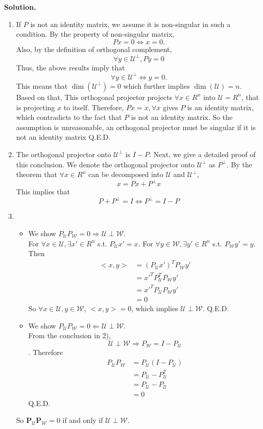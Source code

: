 \documentclass[english,onecolumn]{IEEEtran}
\newcommand{\Pb}{\mathbf{P}}
\newcommand{\Ucal}{\mathcal{U}}
\newcommand{\Wcal}{\mathcal{W}}
\begin{document}
\noindent
\textbf{Solution.}
\begin{enumerate}
	\item If $P$ is not an identity matrix, we assume it is non-singular in such a condition. By the property of non-singular matrix,
	$$Px = 0 \Leftrightarrow x =0.$$
	Also, by the definition of orthogonal complement,
	$$\forall y\in \mathcal{U}^{\perp}, Py=0$$
	Thus, the above results imply that
	$$\forall y\in \mathcal{U}^{\perp}\Leftrightarrow y=0.$$
	This means that $\dim({\mathcal{U}^{\perp}})=0$ which further implies $\dim(\mathcal{U})=n$. Based on that, This orthogonal projector projects $\forall x\in R^n$ into $\mathcal{U}=R^n$, that is projecting $x$ to itself. Therefore, $Px=x,\forall x$ gives $P$ is an identity matrix, which contradicts to the fact that $P$ is not an identity matrix. So the assumption is unreasonable, an orthogonal projector must be singular if it is not an identity matrix Q.E.D.
	\item The orthogonal projector onto $\mathcal{U}^{\perp}$ is $I-P$. Next, we give a detailed proof of this conclusion. We denote the orthogonal projector onto $\mathcal{U}^{\perp}$ as $P^{\perp}$. By the theorem that $\forall x \in R^n$ can be decomposed into $\mathcal{U} $ and $\mathcal{U}^{\perp}$, 
		$$x = Px+P^{\perp}x$$
		This implies that $$P+P^{\perp} = I \Leftrightarrow P^{\perp} = I-P$$
	\item \begin{itemize}
		\item We show $P_\mathcal{U}P_{\mathcal{W}}=0\Rightarrow \mathcal{U}\perp \mathcal{W}$.\\ For $\forall x \in \mathcal{U},\exists x' \in R^n$ s.t. $P_\mathcal{U}x'=x$. For $\forall y \in \mathcal{W},\exists y' \in R^n$ s.t. $P_\mathcal{W}y'=y$. Then 
			\begin{align*}
				<x,y> &= (P_{\mathcal{U}}x')^TP_{\mathcal{W}}y'\\
				&=x'^TP_{\mathcal{U}}^TP_{\mathcal{W}}y'\\
				&=x'^TP_{\mathcal{U}}P_{\mathcal{W}}y'\\
				&=0
			\end{align*}
		So $\forall x\in \mathcal{U},y\in \mathcal{W}$, $<x,y>=0$, which implies $\mathcal{U}\perp\mathcal{W}$. Q.E.D.
		\item We show $P_\mathcal{U}P_{\mathcal{W}}=0\Leftarrow \mathcal{U}\perp \mathcal{W}.$\\
		From the conclusion in 2),$$\mathcal{U}\perp \mathcal{W}\Rightarrow P_{\mathcal{W}} = I - P_{\mathcal{U}}$$.
		Therefore 
		\begin{align*}
			P_{\mathcal{U}}P_{\mathcal{W}} &= P_{\mathcal{U}}(I - P_{\mathcal{U}})\\
			&=P_{\mathcal{U}} - P_{\mathcal{U}}^2\\
			&=P_{\mathcal{U}} - P_{\mathcal{U}}\\
			&=0
		\end{align*}
		Q.E.D.
	\end{itemize}
	So $\Pb_{\Ucal} \Pb_{\Wcal} = 0$ if and only if $\Ucal \perp \Wcal$.
\end{enumerate}
\newpage
\end{document}
